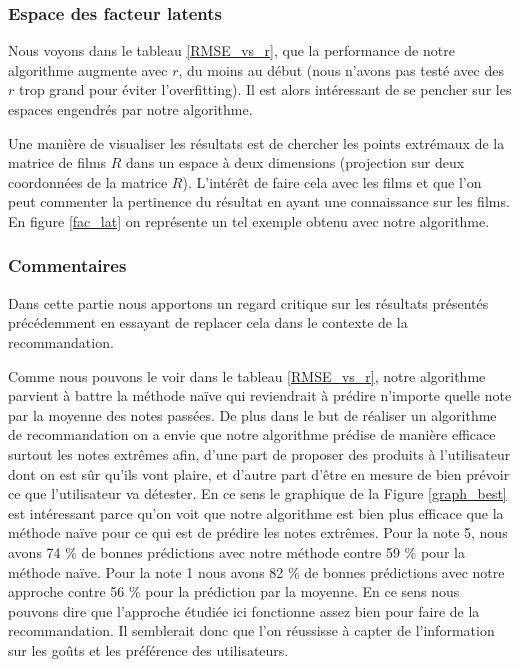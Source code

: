 \documentclass[10pt,a4paper]{article}
\begin{document}
\subsubsection*{Espace des facteur latents}

Nous voyons dans le tableau \ref{RMSE_vs_r}, que la performance de notre algorithme augmente avec $r$, du moins au début (nous n'avons pas testé avec des $r$ trop grand pour éviter l'overfitting). Il est alors intéressant de se pencher sur les espaces engendrés par notre algorithme. 

Une manière de visualiser les résultats est de chercher les points extrémaux de la matrice de films $R$ dans un espace à deux dimensions (projection sur deux coordonnées de la matrice $R$). L'intérêt de faire cela avec les films et que l'on peut commenter la pertinence du résultat en ayant une connaissance sur les films. En figure \ref{fac_lat} on représente un tel exemple obtenu avec notre algorithme.



\subsubsection*{Commentaires}

Dans cette partie nous apportons un regard critique sur les résultats présentés précédemment en essayant de replacer cela dans le contexte de la recommandation. 

Comme nous pouvons le voir dans le tableau \ref{RMSE_vs_r}, notre algorithme parvient à battre la méthode naïve qui reviendrait à prédire n'importe quelle note par la moyenne des notes passées. De plus dans le but de réaliser un algorithme de recommandation on a envie que notre algorithme prédise de manière efficace surtout les notes extrêmes afin, d'une part de proposer des produits à l'utilisateur dont on est sûr qu'ils vont plaire, et d'autre part d'être en mesure de bien prévoir ce que l'utilisateur va détester. En ce sens le graphique de la Figure \ref{graph_best} est intéressant parce qu'on voit que notre algorithme est bien plus efficace que la méthode naïve pour ce qui est de prédire les notes extrêmes. Pour la note 5, nous avons 74 $\%$ de bonnes prédictions avec notre méthode contre 59 $\%$ pour la méthode naïve. Pour la note 1 nous avons 82 $\%$ de bonnes prédictions avec notre approche contre 56 $\%$ pour la prédiction par la moyenne. En ce sens nous pouvons dire que l'approche étudiée ici fonctionne assez bien pour faire de la recommandation. Il semblerait donc que l'on réussisse à capter de l'information sur les goûts et les préférence des utilisateurs.
\end{document}
